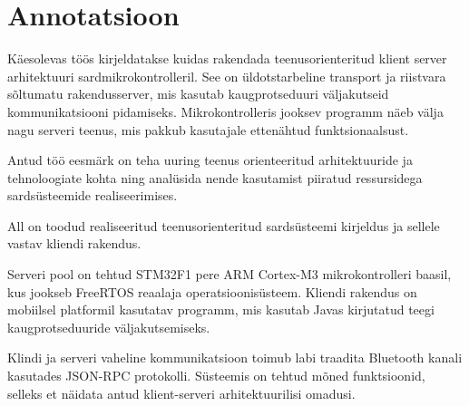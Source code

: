 \clearpage\vspace*{\fill}
\section*{Annotatsioon}
Käesolevas töös kirjeldatakse kuidas rakendada teenusorienteritud klient server arhitektuuri sardmikrokontrolleril.
See on üldotstarbeline transport ja riistvara sõltumatu rakendusserver,
mis kasutab kaugprotseduuri väljakutseid kommunikatsiooni pidamiseks.
Mikrokontrolleris jooksev programm näeb välja nagu serveri teenus,
mis pakkub kasutajale ettenähtud funktsionaalsust.

Antud töö eesmärk on teha uuring teenus orienteeritud arhitektuuride ja tehnoloogiate kohta 
ning analüsida nende kasutamist piiratud ressursidega sardsüsteemide realiseerimises.

All on toodud realiseeritud teenusorienteritud sardsüsteemi kirjeldus ja sellele vastav kliendi rakendus.

Serveri pool on tehtud STM32F1 pere ARM Cortex-M3 mikrokontrolleri baasil, kus jookseb FreeRTOS reaalaja operatsioonisüsteem.
Kliendi rakendus on mobiilsel platformil kasutatav programm, mis kasutab Javas kirjutatud teegi kaugprotseduuride väljakutsemiseks.

Klindi ja serveri vaheline kommunikatsioon toimub labi traadita Bluetooth kanali kasutades JSON-RPC protokolli.
Süsteemis on tehtud mõned funktsioonid, selleks et näidata antud klient-serveri arhitektuurilisi omadusi.


\vspace{\fill}
\clearpage